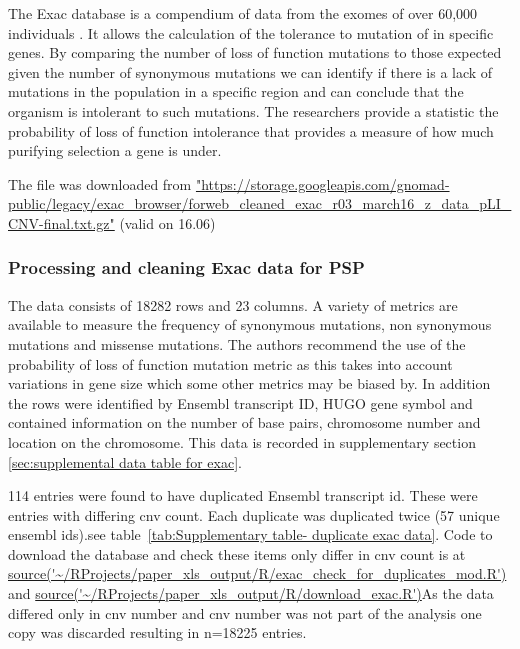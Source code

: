 The Exac database is a compendium of data from the exomes of over 60,000 individuals \cite{lek2016analysis}. It allows the calculation of the tolerance to mutation of in specific genes. By comparing the number of loss of function mutations to those expected given the number of synonymous mutations we can identify if there is a lack of mutations in the population in a specific region and can conclude that the organism is intolerant to such mutations. The researchers provide a statistic the probability of loss of function intolerance that provides a measure of how much purifying selection a gene is under. 

The file was downloaded from 
\url{"https://storage.googleapis.com/gnomad-public/legacy/exac_browser/forweb_cleaned_exac_r03_march16_z_data_pLI_CNV-final.txt.gz"} (valid on 16.06)

\subsubsection{Processing and cleaning Exac data for PSP}
The data consists of 18282 rows and 23 columns. A variety of metrics are available to measure the frequency of synonymous mutations, non synonymous mutations and missense mutations. The authors recommend the use of the probability of loss of function mutation metric as this takes into account variations in gene size which some other metrics may be biased by. In addition the rows were identified by Ensembl transcript ID, HUGO gene symbol and contained information on the number of base pairs, chromosome number and location on the chromosome. This data is recorded in supplementary section~
\ref{sec:supplemental data table for exac}.


114 entries were found to have duplicated Ensembl transcript id. These were entries with differing cnv count. Each duplicate was duplicated twice (57 unique ensembl ids).see table~\ref{tab:Supplementary table- duplicate exac data}. Code to download the database and check these items only differ in cnv count is at \url{source('~/RProjects/paper_xls_output/R/exac_check_for_duplicates_mod.R')} and
\url{source('~/RProjects/paper_xls_output/R/download_exac.R')}As the data differed only in cnv number and cnv number was not part of the analysis one copy was discarded resulting in n=18225 entries. 

